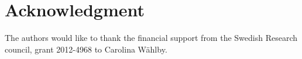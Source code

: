 \documentclass[journal]{IEEEtran}
\begin{document}








%




\section*{Acknowledgment}


The authors would like to thank the financial support from the Swedish Research council, grant  2012-4968 to Carolina W\"ahlby.

\end{document}
